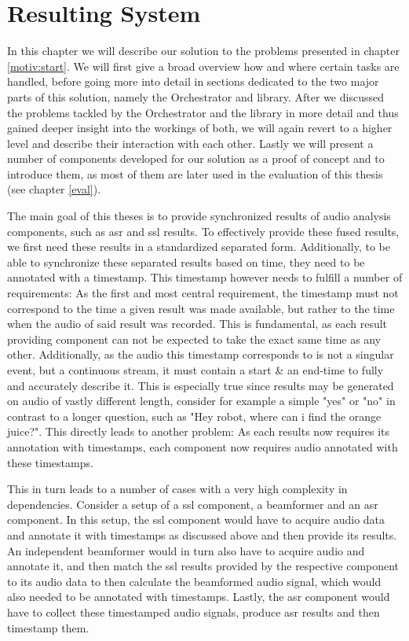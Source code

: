 \chapter{Resulting System}
In this chapter we will describe our solution to the problems presented in chapter \ref{motiv:start}.
We will first give a broad overview how and where certain tasks are handled, before going more into detail in sections dedicated to the two major parts of this solution, namely the Orchestrator and library.
After we discussed the problems tackled by the Orchestrator and the library in more detail and thus gained deeper insight into the workings of both, we will again revert to a higher level and describe their interaction with each other.
Lastly we will present a number of components developed for our solution as a proof of concept and to introduce them, as most of them are later used in the evaluation of this thesis (see chapter \ref{eval}).

The main goal of this theses is to provide synchronized results of audio analysis components, such as \gls{asr} and \gls{ssl} results.
To effectively provide these fused results, we first need these results in a standardized separated form.
Additionally, to be able to synchronize these separated results based on time, they need to be annotated with a timestamp.
This timestamp however needs to fulfill a number of requirements:
As the first and most central requirement, the timestamp must not correspond to the time a given result was made available, but rather to the time when the audio of said result was recorded.
This is fundamental, as each result providing component can not be expected to take the exact same time as any other.
Additionally, as the audio this timestamp corresponds to is not a singular event, but a continuous stream, it must contain a start \& an end-time to fully and accurately describe it.
This is especially true since results may be generated on audio of vastly different length, consider for example a simple "yes" or "no" in contrast to a longer question, such as "Hey robot, where can i find the orange juice?".
This directly leads to another problem:
As each results now requires its annotation with timestamps, each component now requires audio annotated with these timestamps.

This in turn leads to a number of cases with a very high complexity in dependencies.
Consider a setup of a \gls{ssl} component, a beamformer and an \gls{asr} component.
In this setup, the \gls{ssl} component would have to acquire audio data and annotate it with timestamps as discussed above and then provide its results.
An independent beamformer would in turn also have to acquire audio and annotate it, and then match the \gls{ssl} results provided by the respective component to its audio data to then calculate the beamformed audio signal, which would also needed to be annotated with timestamps.
Lastly, the \gls{asr} component would have to collect these timestamped audio signals, produce \gls{asr} results and then timestamp them.

